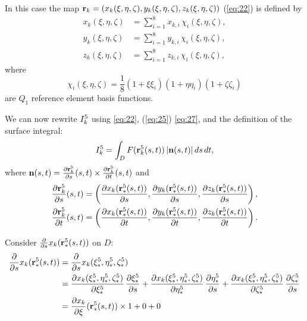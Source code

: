 \documentclass[11pt]{article}
\begin{document}
In this case the map $\mathbf{r}_{k} = \left( x_{k}(\xi,\eta,\zeta), y_{k}(\xi,\eta,\zeta), z_{k}(\xi,\eta,\zeta) \right)$ (\ref{eq:22}) is defined by
\begin{equation}
\label{eq:27}
\begin{aligned}
x_{k}(\xi,\eta,\zeta) &= \sum_{i=1}^{8} x_{k,i}\, \chi_{i}(\xi, \eta, \zeta),\\
y_{k}(\xi,\eta,\zeta) &= \sum_{i=1}^{8} y_{k,i}\, \chi_{i}(\xi, \eta, \zeta),\\
z_{k}(\xi,\eta,\zeta) &= \sum_{i=1}^{8} z_{k,i}\, \chi_{i}(\xi, \eta, \zeta),
\end{aligned}
\end{equation}
where
\begin{equation}
\label{eq:28}
\chi_{i}(\xi,\eta,\zeta) = \frac18 (1 + \xi\xi_{i})(1 + \eta\eta_{i})(1 + \zeta\zeta_{i})
\end{equation}
are $Q_{1}$ reference element basis functions.

We can now rewrite $I_{k}^{5}$ using \eqref{eq:22}, (\ref{eq:25}) \eqref{eq:27}, and the definition of the surface integral:
\begin{equation}
\label{eq:29}
I_{k}^{5} = \int_{D} F(\mathbf{r}_{k}^{5}(s,t))\, | \mathbf{n}(s,t) |\,ds\,dt,
\end{equation}
where $\mathbf{n}(s,t) = \frac{\partial \mathbf{r}_{k}^{5}}{\partial s}(s,t) \times \frac{\partial \mathbf{r}_{k}^{5}}{\partial t}(s,t)$ and
\begin{equation}
\label{eq:30}
\begin{aligned}
\frac{\partial \mathbf{r}_{k}^{5}}{\partial s}(s,t) &= \left(\frac{\partial x_{k}(\mathbf{r}_{*}^{5}(s,t))}{\partial s}, \frac{\partial y_{k}(\mathbf{r}_{*}^{5}(s,t))}{\partial s}, \frac{\partial z_{k}(\mathbf{r}_{*}^{5}(s,t))}{\partial s}\right),\\
\frac{\partial \mathbf{r}_{k}^{5}}{\partial t}(s,t) &= \left(\frac{\partial x_{k}(\mathbf{r}_{*}^{5}(s,t))}{\partial t}, \frac{\partial y_{k}(\mathbf{r}_{*}^{5}(s,t))}{\partial t}, \frac{\partial z_{k}(\mathbf{r}_{*}^{5}(s,t))}{\partial t}\right).
\end{aligned}
\end{equation}

Consider $\frac{\partial }{\partial s}x_{k}(\mathbf{r}_{*}^{5}(s,t))$ on $D$:
\newcommand{\xFr}{x_k(\Fr{\xi}, \Fr{\eta}, \Fr{\zeta})}
\begin{equation}
  \label{eq:31}
  \begin{aligned}
    \diff{}{s}x_{k}(\Fr{\R}(s,t)) &= \diff{}{s}\xFr\\
    &=\diff{\xFr}{\Fr{\xi}}\,\diff{\Fr{\xi}}{s}
    +\diff{\xFr}{\Fr{\eta}}\,\diff{\Fr{\eta}}{s}
    +\diff{\xFr}{\Fr{\zeta}}\,\diff{\Fr{\zeta}}{s}\\
    &=\diff{x_{k}}{\xi}(\Fr{\R}(s,t)) \times 1 + 0 + 0
  \end{aligned}
\end{equation}
\end{document}

